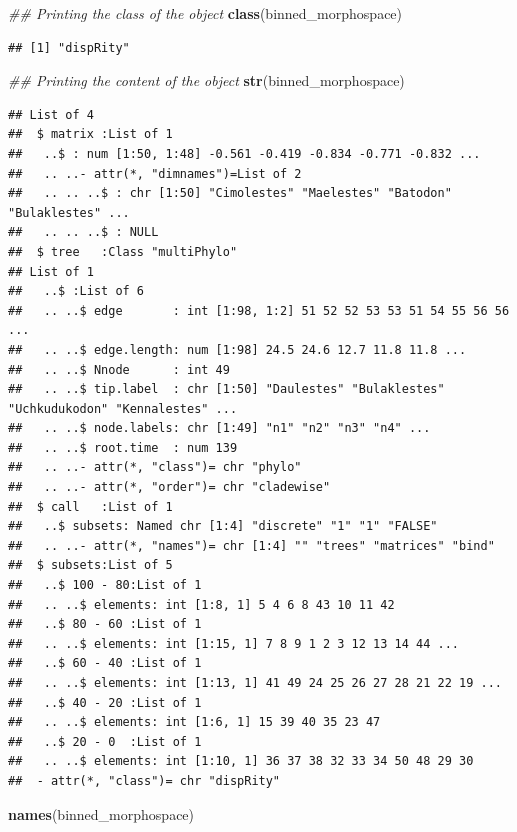 \documentclass[
]{book}
\newenvironment{Shaded}{\begin{snugshade}}{\end{snugshade}}
\newcommand{\CommentTok}[1]{\textcolor[rgb]{0.56,0.35,0.01}{\textit{#1}}}
\newcommand{\KeywordTok}[1]{\textcolor[rgb]{0.13,0.29,0.53}{\textbf{#1}}}
\newcommand{\NormalTok}[1]{#1}
\begin{document}
\begin{Shaded}
\begin{Highlighting}[]
\CommentTok{\#\# Printing the class of the object}
\KeywordTok{class}\NormalTok{(binned\_morphospace)}
\end{Highlighting}
\end{Shaded}

\begin{verbatim}
## [1] "dispRity"
\end{verbatim}

\begin{Shaded}
\begin{Highlighting}[]
\CommentTok{\#\# Printing the content of the object}
\KeywordTok{str}\NormalTok{(binned\_morphospace)}
\end{Highlighting}
\end{Shaded}

\begin{verbatim}
## List of 4
##  $ matrix :List of 1
##   ..$ : num [1:50, 1:48] -0.561 -0.419 -0.834 -0.771 -0.832 ...
##   .. ..- attr(*, "dimnames")=List of 2
##   .. .. ..$ : chr [1:50] "Cimolestes" "Maelestes" "Batodon" "Bulaklestes" ...
##   .. .. ..$ : NULL
##  $ tree   :Class "multiPhylo"
## List of 1
##   ..$ :List of 6
##   .. ..$ edge       : int [1:98, 1:2] 51 52 52 53 53 51 54 55 56 56 ...
##   .. ..$ edge.length: num [1:98] 24.5 24.6 12.7 11.8 11.8 ...
##   .. ..$ Nnode      : int 49
##   .. ..$ tip.label  : chr [1:50] "Daulestes" "Bulaklestes" "Uchkudukodon" "Kennalestes" ...
##   .. ..$ node.labels: chr [1:49] "n1" "n2" "n3" "n4" ...
##   .. ..$ root.time  : num 139
##   .. ..- attr(*, "class")= chr "phylo"
##   .. ..- attr(*, "order")= chr "cladewise"
##  $ call   :List of 1
##   ..$ subsets: Named chr [1:4] "discrete" "1" "1" "FALSE"
##   .. ..- attr(*, "names")= chr [1:4] "" "trees" "matrices" "bind"
##  $ subsets:List of 5
##   ..$ 100 - 80:List of 1
##   .. ..$ elements: int [1:8, 1] 5 4 6 8 43 10 11 42
##   ..$ 80 - 60 :List of 1
##   .. ..$ elements: int [1:15, 1] 7 8 9 1 2 3 12 13 14 44 ...
##   ..$ 60 - 40 :List of 1
##   .. ..$ elements: int [1:13, 1] 41 49 24 25 26 27 28 21 22 19 ...
##   ..$ 40 - 20 :List of 1
##   .. ..$ elements: int [1:6, 1] 15 39 40 35 23 47
##   ..$ 20 - 0  :List of 1
##   .. ..$ elements: int [1:10, 1] 36 37 38 32 33 34 50 48 29 30
##  - attr(*, "class")= chr "dispRity"
\end{verbatim}

\begin{Shaded}
\begin{Highlighting}[]
\KeywordTok{names}\NormalTok{(binned\_morphospace)}
\end{Highlighting}
\end{Shaded}
\end{document}
